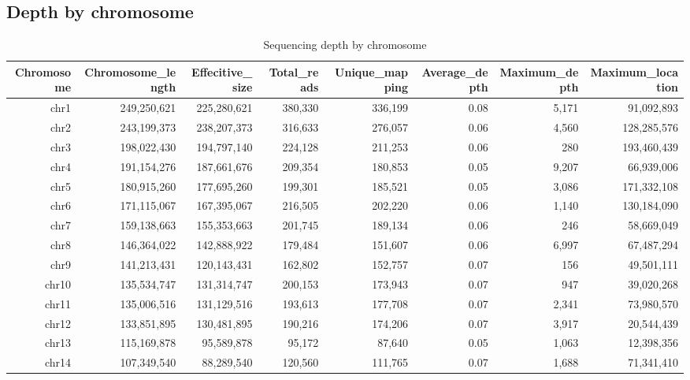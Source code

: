 \documentclass{article}
\begin{document}
\subsection{Depth by chromosome}
\begin{center}
{\tiny
\begin{longtable}{|r|r|r|r|r|r|r|r|}
\caption{Sequencing depth by chromosome} \\ 
  \hline
Chromosome & Chromosome\_length & Effecitive\_size & Total\_reads & Unique\_mapping & Average\_depth & Maximum\_depth & Maximum\_location \\ 
  \hline
chr1 & 249,250,621 & 225,280,621 & 380,330 & 336,199 & 0.08 & 5,171 &  91,092,893 \\ 
   \rowcolor[gray]{0.9}chr2 & 243,199,373 & 238,207,373 & 316,633 & 276,057 & 0.06 & 4,560 & 128,285,576 \\ 
  chr3 & 198,022,430 & 194,797,140 & 224,128 & 211,253 & 0.06 &   280 & 193,460,439 \\ 
   \rowcolor[gray]{0.9}chr4 & 191,154,276 & 187,661,676 & 209,354 & 180,853 & 0.05 & 9,207 &  66,939,006 \\ 
  chr5 & 180,915,260 & 177,695,260 & 199,301 & 185,521 & 0.05 & 3,086 & 171,332,108 \\ 
   \rowcolor[gray]{0.9}chr6 & 171,115,067 & 167,395,067 & 216,505 & 202,220 & 0.06 & 1,140 & 130,184,090 \\ 
  chr7 & 159,138,663 & 155,353,663 & 201,745 & 189,134 & 0.06 &   246 &  58,669,049 \\ 
   \rowcolor[gray]{0.9}chr8 & 146,364,022 & 142,888,922 & 179,484 & 151,607 & 0.06 & 6,997 &  67,487,294 \\ 
  chr9 & 141,213,431 & 120,143,431 & 162,802 & 152,757 & 0.07 &   156 &  49,501,111 \\ 
   \rowcolor[gray]{0.9}chr10 & 135,534,747 & 131,314,747 & 200,153 & 173,943 & 0.07 &   947 &  39,020,268 \\ 
  chr11 & 135,006,516 & 131,129,516 & 193,613 & 177,708 & 0.07 & 2,341 &  73,980,570 \\ 
   \rowcolor[gray]{0.9}chr12 & 133,851,895 & 130,481,895 & 190,216 & 174,206 & 0.07 & 3,917 &  20,544,439 \\ 
  chr13 & 115,169,878 &  95,589,878 &  95,172 &  87,640 & 0.05 & 1,063 &  12,398,356 \\ 
   \rowcolor[gray]{0.9}chr14 & 107,349,540 &  88,289,540 & 120,560 & 111,765 & 0.07 & 1,688 &  71,341,410 \\ 

\end{longtable}}
\end{center}
\end{document}
